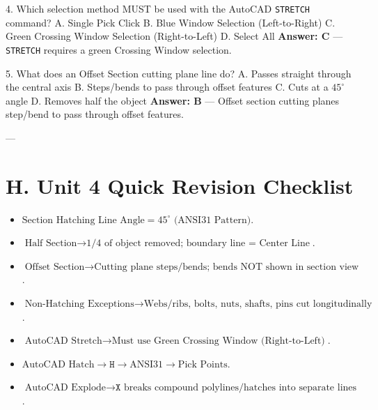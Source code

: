 4. Which selection method MUST be used with the AutoCAD \texttt{STRETCH} command?  
   A. Single Pick Click  
   B. Blue Window Selection (Left-to-Right)  
   C. Green Crossing Window Selection (Right-to-Left)  
   D. Select All  
   \textbf{Answer: C} — \texttt{STRETCH} requires a green Crossing Window selection.

5. What does an Offset Section cutting plane line do?  
   A. Passes straight through the central axis  
   B. Steps/bends to pass through offset features  
   C. Cuts at a $45^\circ$ angle  
   D. Removes half the object  
   \textbf{Answer: B} — Offset section cutting planes step/bend to pass through offset features.

---

\section{H. Unit 4 Quick Revision Checklist}
\begin{revisionchecklist}
\begin{itemize}
    \item $\text{Section Hatching Line Angle} = 45^\circ \text{ (ANSI31 Pattern)}$.
    \item $\text{Half Section} \to \text{1/4 of object removed; boundary line = Center Line}$.
    \item $\text{Offset Section} \to \text{Cutting plane steps/bends; bends NOT shown in section view}$.
    \item $\text{Non-Hatching Exceptions} \to \text{Webs/ribs, bolts, nuts, shafts, pins cut longitudinally}$.
    \item $\text{AutoCAD Stretch} \to \text{Must use Green Crossing Window (Right-to-Left)}$.
    \item $\text{AutoCAD Hatch} \to \texttt{H} \to \text{ANSI31} \to \text{Pick Points}$.
    \item $\text{AutoCAD Explode} \to \texttt{X} \text{ breaks compound polylines/hatches into separate lines}$.
\end{itemize}
\end{revisionchecklist}
